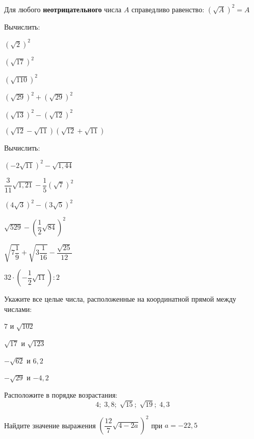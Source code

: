 \begin{class}[number=2]
\begin{listofex}[resume]
	\end{listofex}
	\begin{definit}
		Для любого \textbf{неотрицательного} числа \( A \) справедливо равенство: \( \left( \sqrt{A} \right)^2=A \)
	\end{definit}
	\begin{listofex}[resume]
		\item Вычислить:
		\begin{enumcols}[itemcolumns=3]
			\item \( (\sqrt{2})^2 \)
			\item \( (\sqrt{17})^2 \)
			\item \( (\sqrt{110})^2 \)
			\item \( (\sqrt{29})^2+(\sqrt{29})^2 \)
			\item \( (\sqrt{13})^2-(\sqrt{12})^2 \)
			\item \( (\sqrt{12}-\sqrt{11})(\sqrt{12}+\sqrt{11}) \)
		\end{enumcols}
		\item Вычислить:
		\begin{enumcols}[itemcolumns=3]
			\item \( (-2\sqrt{11})^2-\sqrt{1,44} \)
			\item \( \dfrac{3}{11}\sqrt{1,21}-\dfrac{1}{5}(\sqrt{7})^2 \)
			\item \( (4\sqrt{3})^2-(3\sqrt{5})^2 \)
			\item \( \sqrt{529}-\left( \dfrac{1}{2}\sqrt{84} \right)^2 \)
			\item \( \sqrt{7\dfrac{1}{9}}+\sqrt{3\dfrac{1}{16}}-\dfrac{\sqrt{25}}{12} \)
			\item \( 32\cdot\left( -\dfrac{1}{2}\sqrt{11} \right):2 \)
		\end{enumcols}
		\item Укажите все целые числа, расположенные на координатной прямой между числами:
		\begin{enumcols}[itemcolumns=4]
			\item \( 7 \) и \( \sqrt{102} \)
			\item \( \sqrt{17} \) и \( \sqrt{123} \)
			\item \( -\sqrt{62} \) и \( 6,2 \)
			\item \( -\sqrt{29} \) и \( -4,2 \)
		\end{enumcols}
		\item Расположите в порядке возрастания: \[ 4;\;3,8;\;\sqrt{15};\;\sqrt{19};\;4,3 \]
		\item Найдите значение выражения \( \left( \dfrac{12}{7}\sqrt{4-2a} \right)^2 \) при \( a=-22,5 \)
	\end{listofex}
\end{class}
